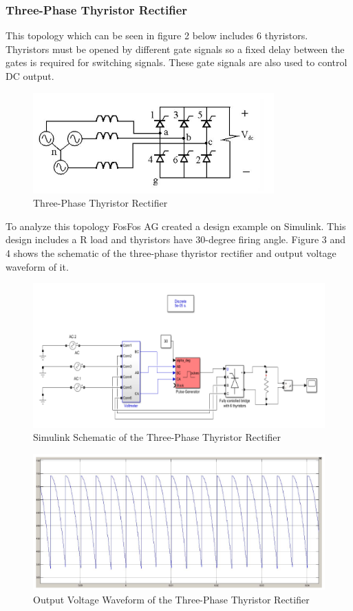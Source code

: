 \documentclass{article}
\begin{document}
\subsubsection{Three-Phase Thyristor Rectifier} %
This topology which can be seen in figure 2 below includes 6 thyristors. Thyristors must be opened by different gate signals so a fixed delay between the gates is required for switching signals. These gate signals are also used to control DC output. 
\begin{figure}[h!]
\centering
\includegraphics[scale=0.65]{ucfazthytopo}
\caption{Three-Phase Thyristor Rectifier}
\label{fig:members}
\end{figure} 
\par To analyze this topology FosFos AG created a design example on Simulink. This design includes a R load and thyristors have 30-degree firing angle. Figure 3 and 4 shows the schematic of the three-phase thyristor rectifier and output voltage waveform of it.
\begin{figure}[h!]
\centering
\includegraphics[scale=0.55]{ucfazthycct}
\caption{Simulink Schematic of the Three-Phase Thyristor Rectifier}
\label{fig:members}
\end{figure} 

\begin{figure}[h!]
\centering
\includegraphics[scale=0.55]{ucfazthyvoltage}
\caption{Output Voltage Waveform of the Three-Phase Thyristor Rectifier}
\label{fig:members}
\end{figure} 
\end{document}
